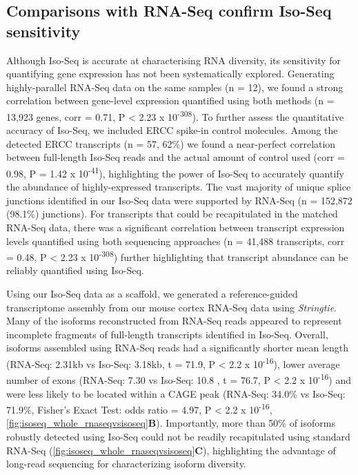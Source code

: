 \newpage
\subsection{Comparisons with RNA-Seq confirm Iso-Seq sensitivity} 
\label{sec: whole_isoseqvsrnaseq}
Although Iso-Seq is accurate at characterising RNA diversity\cite{Wang2019}, its sensitivity for quantifying gene expression has not been systematically explored. Generating highly-parallel RNA-Seq data on the same samples (n = 12), we found a strong correlation between gene-level expression quantified using both methods (n = 13,923 genes, corr = 0.71, P < 2.23 x 10\textsuperscript{-308}). To further assess the quantitative accuracy of Iso-Seq, we included ERCC spike-in control molecules. Among the detected ERCC transcripts (n = 57, 62\%) we found a near-perfect correlation between full-length Iso-Seq reads and the actual amount of control used (corr = 0.98, P = 1.42 x 10\textsuperscript{-41}), highlighting the power of Iso-Seq to accurately quantify the abundance of highly-expressed transcripts. The vast majority of unique splice junctions identified in our Iso-Seq data were supported by RNA-Seq (n = 152,872 (98.1\%) junctions). For transcripts that could be recapitulated in the matched RNA-Seq data, there was a significant correlation between transcript expression levels quantified using both sequencing approaches (n = 41,488 transcripts, corr = 0.48, P < 2.23 x 10\textsuperscript{-308}) further highlighting that transcript abundance can be reliably quantified using Iso-Seq. 

Using our Iso-Seq data as a scaffold, we generated a reference-guided transcriptome assembly from our mouse cortex RNA-Seq data using \textit{Stringtie}\cite{Pertea2015}. Many of the isoforms reconstructed from RNA-Seq reads appeared to represent incomplete fragments of full-length transcripts identified in Iso-Seq. Overall, isoforms assembled using RNA-Seq reads had a significantly shorter mean length (RNA-Seq: 2.31kb vs Iso-Seq: 3.18kb, t = 71.9, P < 2.2 x 10\textsuperscript{-16}), lower average number of exons (RNA-Seq: 7.30 vs Iso-Seq: 10.8 , t = 76.7, P < 2.2 x 10\textsuperscript{-16}) and were less likely to be located within a CAGE peak (RNA-Seq: 34.0\% vs Iso-Seq: 71.9\%, Fisher’s Exact Test: odds ratio = 4.97, P < 2.2 x 10\textsuperscript{-16}, \cref{fig:isoseq_whole_rnaseqvsisoseq}\textbf{B}). Importantly, more than 50\% of isoforms robustly detected using Iso-Seq could not be readily recapitulated using standard RNA-Seq (\cref{fig:isoseq_whole_rnaseqvsisoseq}\textbf{C}), highlighting the advantage of long-read sequencing for characterizing isoform diversity.%

